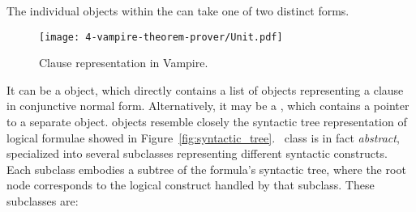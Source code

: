 The individual  objects within the  can take one of two distinct forms.

\begin{figure}[H]
  \centering
  \texttt{[image: 4-vampire-theorem-prover/Unit.pdf]}
  \caption{Clause representation in Vampire.}\label{fig:clause-representation}
\end{figure}


It can  be a  object, which directly contains a list of  objects representing a clause in conjunctive normal form.
Alternatively, it may be a , which contains a pointer to a separate  object.
 objects resemble closely the syntactic tree representation of logical formulae showed in Figure~\ref{fig:syntactic_tree}.\  class is in fact \emph{abstract}, specialized into several subclasses representing different syntactic constructs.
Each subclass embodies a subtree of the formula's syntactic tree, where the root node corresponds to the logical construct handled by that subclass.
These subclasses are:

